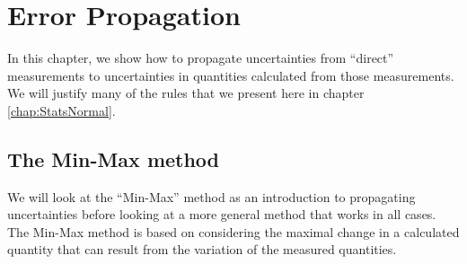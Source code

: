 %
\chapter{Error Propagation}
\label{chap:ErrorPropagation}
In this chapter, we show how to propagate uncertainties from ``direct'' measurements to uncertainties in quantities calculated from those measurements. We will justify many of the rules that we present here in chapter \ref{chap:StatsNormal}.

\section{The Min-Max method}
We will look at the ``Min-Max'' method as an introduction to propagating uncertainties before looking at a more general method that works in all cases. The Min-Max method is based on considering the maximal change in a calculated quantity that can result from the variation of the measured quantities.

